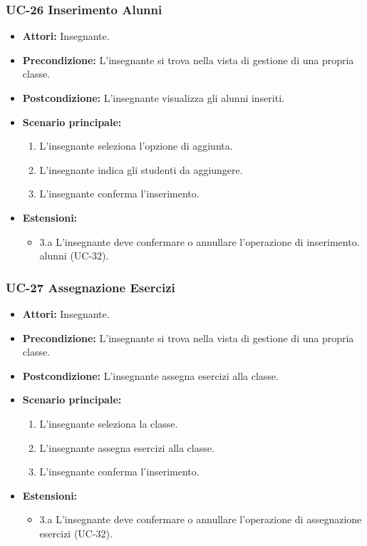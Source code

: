 \subsubsection{UC-26 Inserimento Alunni}
\begin{itemize}
	\item \textbf{Attori:} Insegnante.
	\item \textbf{Precondizione:} L'insegnante si trova nella vista di gestione di una propria classe.
	\item \textbf{Postcondizione:} L'insegnante visualizza gli alunni inseriti.
	\item \textbf{Scenario principale:}
	\begin{enumerate}
		\item L'insegnante seleziona l'opzione di aggiunta.
		\item L'insegnante indica gli studenti da aggiungere.
		\item L'insegnante conferma l'inserimento.
	\end{enumerate}
	\item \textbf{Estensioni:}
\begin{itemize}
	\item 3.a L'insegnante deve confermare o annullare l'operazione di inserimento. alunni (UC-32).
\end{itemize}
\end{itemize}

\subsubsection{UC-27 Assegnazione Esercizi}
\begin{itemize}
	\item \textbf{Attori:} Insegnante.
	\item \textbf{Precondizione:} L'insegnante si trova nella vista di gestione di una propria classe.
	\item \textbf{Postcondizione:} L'insegnante assegna esercizi alla classe.
	\item \textbf{Scenario principale:}
	\begin{enumerate}
		\item L'insegnante seleziona la classe.
		\item L'insegnante assegna esercizi alla classe.
		\item L'insegnante conferma l'inserimento.
	\end{enumerate}
\item \textbf{Estensioni:}
\begin{itemize}
	\item 3.a L'insegnante deve confermare o annullare l'operazione di assegnazione esercizi (UC-32).
\end{itemize}
\end{itemize}




